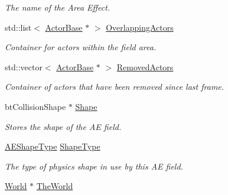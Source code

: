 \begin{DoxyCompactItemize}
\begin{DoxyCompactList}\small\item\em The name of the Area Effect. \item\end{DoxyCompactList}\item 
\hypertarget{classphys_1_1AreaEffect_a45834591f0ea49ba6657ce58d070ee9b}{
std::list$<$ \hyperlink{classphys_1_1ActorBase}{ActorBase} $\ast$ $>$ \hyperlink{classphys_1_1AreaEffect_a45834591f0ea49ba6657ce58d070ee9b}{OverlappingActors}}
\label{classphys_1_1AreaEffect_a45834591f0ea49ba6657ce58d070ee9b}

\begin{DoxyCompactList}\small\item\em Container for actors within the field area. \item\end{DoxyCompactList}\item 
\hypertarget{classphys_1_1AreaEffect_a1b1b6cced61ead4d6de3d8bad5c2125a}{
std::vector$<$ \hyperlink{classphys_1_1ActorBase}{ActorBase} $\ast$ $>$ \hyperlink{classphys_1_1AreaEffect_a1b1b6cced61ead4d6de3d8bad5c2125a}{RemovedActors}}
\label{classphys_1_1AreaEffect_a1b1b6cced61ead4d6de3d8bad5c2125a}

\begin{DoxyCompactList}\small\item\em Container of actors that have been removed since last frame. \item\end{DoxyCompactList}\item 
\hypertarget{classphys_1_1AreaEffect_af8189f9e8dc4bf04f44550918e0ee117}{
btCollisionShape $\ast$ \hyperlink{classphys_1_1AreaEffect_af8189f9e8dc4bf04f44550918e0ee117}{Shape}}
\label{classphys_1_1AreaEffect_af8189f9e8dc4bf04f44550918e0ee117}

\begin{DoxyCompactList}\small\item\em Stores the shape of the AE field. \item\end{DoxyCompactList}\item 
\hypertarget{classphys_1_1AreaEffect_a1465c564cc8e32b8a530881c5db70b88}{
\hyperlink{classphys_1_1AreaEffect_a99b8746c43eac266d48ad613110dc6f9}{AEShapeType} \hyperlink{classphys_1_1AreaEffect_a1465c564cc8e32b8a530881c5db70b88}{ShapeType}}
\label{classphys_1_1AreaEffect_a1465c564cc8e32b8a530881c5db70b88}

\begin{DoxyCompactList}\small\item\em The type of physics shape in use by this AE field. \item\end{DoxyCompactList}\item 
\hypertarget{classphys_1_1AreaEffect_a3008e8e90236141ca4c21a9580e6f5de}{
\hyperlink{classphys_1_1World}{World} $\ast$ \hyperlink{classphys_1_1AreaEffect_a3008e8e90236141ca4c21a9580e6f5de}{TheWorld}}
\label{classphys_1_1AreaEffect_a3008e8e90236141ca4c21a9580e6f5de}


\end{DoxyCompactItemize}

